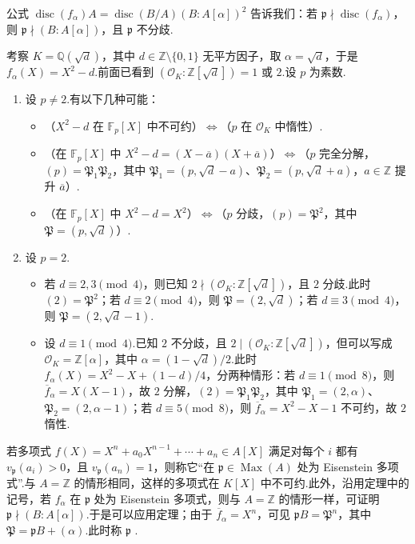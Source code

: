 \begin{remark*}
公式 $\operatorname{disc}(f_\alpha)A=\operatorname{disc}(B/A)(B:A[\alpha])^2$ 告诉我们：若 $\mathfrak p\nmid\operatorname{disc}(f_\alpha)$，则 $\mathfrak p\nmid(B:A[\alpha])$，且 $\mathfrak p$ 不分歧.
\end{remark*}
\begin{example*}[二次数域]
考察 $K=\mathbb Q(\sqrt d)$，其中 $d\in\mathbb Z\setminus\{0,1\}$ 无平方因子，取 $\alpha=\sqrt d$，于是 $f_\alpha(X)=X^2-d$.前面已看到 $(\mathcal O_K:\mathbb Z[\sqrt d])=1$ 或 $2$.设 $p$ 为素数.
\begin{enumerate}[label=\roman*)]
\item 设 $p\ne2$.有以下几种可能：
\begin{itemize}
\item （$X^2-d$ 在 $\mathbb F_p[X]$ 中不可约）$\Leftrightarrow$（$p$ 在 $\mathcal O_K$ 中惰性）.
\item （在 $\mathbb F_p[X]$ 中 $X^2-d=(X-\overline a)(X+\overline a)$）$\Leftrightarrow$（$p$ 完全分解，$(p)=\mathfrak P_1\mathfrak P_2$，其中 $\mathfrak P_1=(p,\sqrt d-a)$、$\mathfrak P_2=(p,\sqrt d+a)$，$a\in\mathbb Z$ 提升 $\overline a$）.
\item （在 $\mathbb F_p[X]$ 中 $X^2-d=X^2$）$\Leftrightarrow$（$p$ 分歧，$(p)=\mathfrak P^2$，其中 $\mathfrak P=(p,\sqrt d)$）.
\end{itemize}
\item 设 $p=2$.
\begin{itemize}
\item 若 $d\equiv2,3\pmod4$，则已知 $2\nmid(\mathcal O_K:\mathbb Z[\sqrt d])$，且 $2$ 分歧.此时 $(2)=\mathfrak P^2$；若 $d\equiv2\pmod4$，则 $\mathfrak P=(2,\sqrt d)$；若 $d\equiv3\pmod4$，则 $\mathfrak P=(2,\sqrt d-1)$.
\item 设 $d\equiv1\pmod4$.已知 $2$ 不分歧，且 $2\mid(\mathcal O_K:\mathbb Z[\sqrt d])$，但可以写成 $\mathcal O_K=\mathbb Z[\alpha]$，其中 $\alpha=(1-\sqrt d)/2$.此时 $f_\alpha(X)=X^2-X+(1-d)/4$，分两种情形：若 $d\equiv1\pmod8$，则 $\overline f_\alpha=X(X-1)$，故 $2$ 分解，$(2)=\mathfrak P_1\mathfrak P_2$，其中 $\mathfrak P_1=(2,\alpha)$、$\mathfrak P_2=(2,\alpha-1)$；若 $d\equiv5\pmod8$，则 $\overline f_\alpha=X^2-X-1$ 不可约，故 $2$ 惰性.
\end{itemize}
\end{enumerate}
\end{example*}
\begin{example*}[Eisenstein 情形]
若多项式 $f(X)=X^n+a_0X^{n-1}+\cdots+a_n\in A[X]$ 满足对每个 $i$ 都有 $v_{\mathfrak p}(a_i)>0$，且 $v_{\mathfrak p}(a_n)=1$，则称它``在 $\mathfrak p\in\operatorname{Max}(A)$ 处为 Eisenstein 多项式''.与 $A=\mathbb Z$ 的情形相同，这样的多项式在 $K[X]$ 中不可约.此外，沿用定理中的记号，若 $f_\alpha$ 在 $\mathfrak p$ 处为 Eisenstein 多项式，则与 $A=\mathbb Z$ 的情形一样，可证明 $\mathfrak p\nmid(B:A[\alpha])$.于是可以应用定理；由于 $\overline f_\alpha=X^n$，可见 $\mathfrak pB=\mathfrak P^n$，其中 $\mathfrak P=\mathfrak pB+(\alpha)$.此时称 $\mathfrak p$ .
\end{example*}
